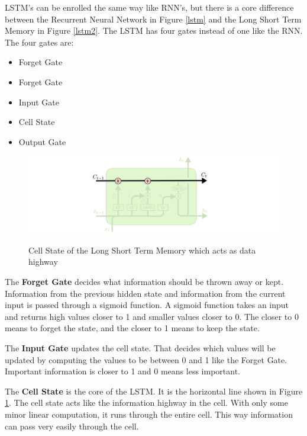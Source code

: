 LSTM's can be enrolled the same way like RNN's, but there is a core difference between the Recurrent Neural Network in Figure \ref{lstm} and the Long Short Term Memory in Figure \ref{lstm2}. The LSTM has four gates instead of one like the RNN. The four gates are:

\begin{itemize}		
	\item Forget Gate
	\item Forget Gate
	\item Input Gate
	\item Cell State
	\item Output Gate
\end{itemize}

\begin{figure}
	\begin{center}
		\includegraphics[width=4.5in]{photos/LSTM3-C-line}\\
		\caption{Cell State of the Long Short Term Memory which acts as data highway \cite{olah}}\label{lstm3}
	\end{center}
\end{figure}

The \textbf{Forget Gate} decides what information should be thrown away or kept. Information from the previous hidden state and information from the current input is passed through a sigmoid function. A sigmoid function takes an input and returns high values closer to 1 and smaller values closer to 0. The closer to 0 means to forget the state, and the closer to 1 means to keep the state.

The \textbf{Input Gate} updates the cell state. That decides which values will be updated by computing the values to be between 0 and 1 like the Forget Gate. Important information is closer to 1 and 0 means less important.

The \textbf{Cell State} is the core of the LSTM. It is the horizontal line shown in Figure \ref{lstm3}. The cell state acts like the information highway in the cell. With only some minor linear computation, it runs through the entire cell. This way information can pass very easily through the cell. 

